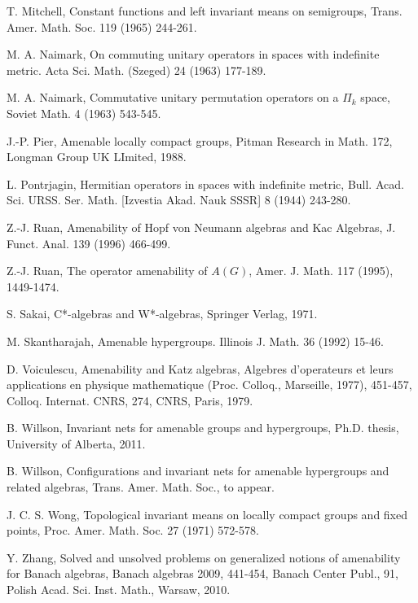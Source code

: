 \documentclass{tran-l}
\numberwithin{equation}{section}
\theoremstyle{definition}
\theoremstyle{remark}
\begin{document}
\begin{thebibliography}{99}
T. Mitchell, Constant functions and left invariant means on semigroups, Trans. Amer. Math. Soc. 119 (1965) 244-261.

M. A. Naimark, On commuting unitary operators in spaces with indefinite metric. Acta Sci. Math. (Szeged) 24 (1963) 177-189.

M. A. Naimark, Commutative unitary permutation operators on a $\Pi_k$ space, Soviet Math. 4 (1963) 543-545. 

J.-P. Pier, Amenable locally compact groups, Pitman Research in Math. 172, Longman Group UK LImited, 1988.

L. Pontrjagin, Hermitian operators in spaces with indefinite metric,  Bull. Acad. Sci. URSS. Ser. Math. [Izvestia Akad. Nauk SSSR] 8 (1944) 243-280.

Z.-J. Ruan,
Amenability of Hopf von Neumann algebras and Kac Algebras, J. Funct. Anal. 139 (1996) 466-499.

Z.-J. Ruan, The operator amenability of $A(G)$, Amer. J. Math. 117 (1995), 1449-1474.

S. Sakai, C*-algebras and W*-algebras, Springer Verlag, 1971.

M. Skantharajah, Amenable hypergroups. Illinois J. Math. 36 (1992) 15-46.

D. Voiculescu, Amenability and Katz algebras, Algebres d'operateurs et leurs applications en physique mathematique (Proc. Colloq., Marseille, 1977), 451-457, Colloq. Internat. CNRS, 274, CNRS, Paris, 1979. 

B. Willson,
Invariant nets for amenable groups and hypergroups, Ph.D. thesis, University of Alberta, 2011.

B. Willson, Configurations and invariant nets for amenable hypergroups and related algebras, Trans. Amer. Math. Soc., to appear.

J. C. S. Wong, Topological invariant means on locally compact groups and fixed points, Proc. Amer. Math. Soc. 27 (1971) 572-578.

Y. Zhang,  Solved and unsolved problems on generalized notions of amenability for Banach algebras, Banach algebras 2009, 441-454, Banach Center Publ., 91, Polish Acad. Sci. Inst. Math., Warsaw, 2010.

\end{thebibliography}
\end{document}
